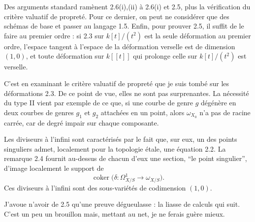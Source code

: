 \documentclass[11pt]{article}
\newcommand{\coker}{\operatorname{coker}}
\begin{document}
Des arguments standard ramènent 2.6(i),(ii) à 2.6(i) et 2.5, plus la vérification du critère valuatif de propreté. Pour ce dernier, on peut ne considérer que des schémas de base et passer au langage 1.5. Enfin, pour prouver 2.5, il suffit de le faire au premier ordre : si 2.3 sur $k[t]/(t^2)$ est la seule déformation au premier ordre, l'espace tangent à l'espace de la déformation verselle est de dimension $(1,0)$, et toute déformation sur $k[[t]]$ qui prolonge celle sur $k[t]/(t^2)$ est verselle.

C'est en examinant le critère valuatif de propreté que je suis tombé sur les déformations 2.3. De ce point de vue, elles ne sont pas surprenantes. La nécessité du type II vient par exemple de ce que, si une courbe de genre $g$ dégénère en deux courbes de genres $g_1$ et $g_2$ attachées en un point, alors $\omega_{X_0}$ n'a pas de racine carrée, car de degré impair sur chaque composante.

Les diviseurs à l'infini sont caractérisés par le fait que, sur eux, un des points singuliers admet, localement pour la topologie étale, une équation 2.2. La remarque 2.4 fournit au-dessus de chacun d'eux une section, ``le point singulier'', d'image localement le support de
\[
  \coker\bigl(\delta:\Omega^1_{X/S}\longrightarrow\omega_{X/S}\bigr).
\]
Ces diviseurs à l'infini sont des sous-variétés de codimension $(1,0)$.

J'avoue n'avoir de 2.5 qu'une preuve dégueulasse : la liasse de calculs qui suit. C'est un peu un brouillon mais, mettant au net, je ne ferais guère mieux.
\end{document}
